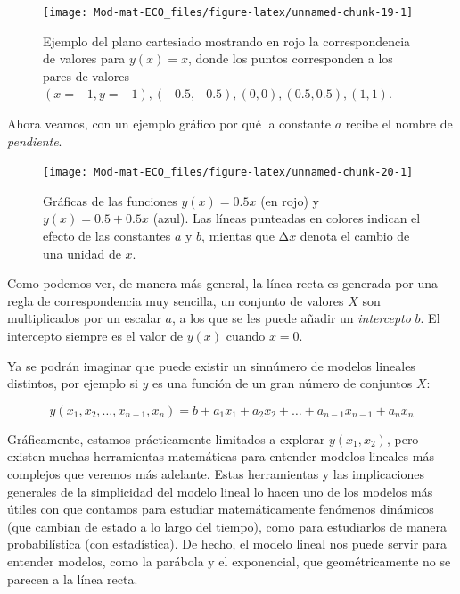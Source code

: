 \documentclass[
]{book}
\begin{document}
\begin{figure}

{\centering \texttt{[image: Mod-mat-ECO\_files/figure-latex/unnamed-chunk-19-1]} 

}

\caption{Ejemplo del plano cartesiado mostrando en rojo la correspondencia de valores para $y(x) = x$, donde los puntos corresponden a los pares de valores $(x = -1, y = -1), (-0.5, -0.5), (0, 0), (0.5, 0.5), (1, 1)$.}\label{fig:unnamed-chunk-19}
\end{figure}

Ahora veamos, con un ejemplo gráfico por qué la constante \(a\) recibe el nombre de \emph{pendiente}.

\begin{figure}

{\centering \texttt{[image: Mod-mat-ECO\_files/figure-latex/unnamed-chunk-20-1]} 

}

\caption{Gráficas de las funciones $y(x) = 0.5 x$ (en rojo) y $y(x) = 0.5 + 0.5 x$ (azul). Las líneas punteadas en colores indican el efecto de las constantes $a$ y $b$, mientas que Δ$x$ denota el cambio de una unidad de $x$.}\label{fig:unnamed-chunk-20}
\end{figure}

Como podemos ver, de manera más general, la línea recta es generada por una regla de correspondencia muy sencilla, un conjunto de valores \(X\) son multiplicados por un escalar \(a\), a los que se les puede añadir un \emph{intercepto} \(b\). El intercepto siempre es el valor de \(y(x)\) cuando \(x = 0\).

Ya se podrán imaginar que puede existir un sinnúmero de modelos lineales distintos, por ejemplo si \(y\) es una función de un gran número de conjuntos \(X\):

\begin{equation}
y(x_1, x_2, \dots, x_{n-1}, x_n) = b + a_1 x_1 + a_2 x_2 + \dots + a_{n-1} x_{n-1} + a_n x_n
\end{equation}

Gráficamente, estamos prácticamente limitados a explorar \(y(x_1, x_2)\), pero existen muchas herramientas matemáticas para entender modelos lineales más complejos que veremos más adelante. Estas herramientas y las implicaciones generales de la simplicidad del modelo lineal lo hacen uno de los modelos más útiles con que contamos para estudiar matemáticamente fenómenos dinámicos (que cambian de estado a lo largo del tiempo), como para estudiarlos de manera probabilística (con estadística). De hecho, el modelo lineal nos puede servir para entender modelos, como la parábola y el exponencial, que geométricamente no se parecen a la línea recta.
\end{document}
